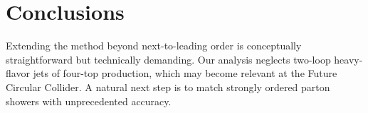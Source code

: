 \section{Conclusions}\label{sec:conclusions}

Extending the method beyond next-to-leading order is conceptually
straightforward but technically demanding. Our analysis neglects
two-loop heavy-flavor jets of four-top production, which may become
relevant at the Future Circular Collider. A natural next step is to
match strongly ordered parton showers with unprecedented accuracy.

